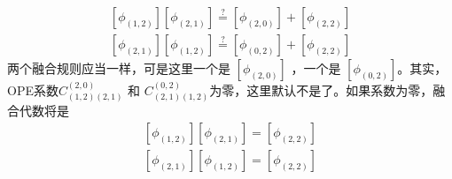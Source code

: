 \begin{equation}
\begin{array}{l} {\left[\phi_{(1,2)}\right]\left[\phi_{(2,1)}\right] \stackrel{?}{=}\left[\phi_{(2,0)}\right]+\left[\phi_{(2,2)}\right]} \\ {\left[\phi_{(2,1)}\right]\left[\phi_{(1,2)}\right] \stackrel{?}{=}\left[\phi_{(0,2)}\right]+\left[\phi_{(2,2)}\right]} \end{array}
\end{equation}
两个融合规则应当一样，可是这里一个是 $\left[\phi_{(2,0)}\right]$ ，一个是 $\left[\phi_{(0,2)}\right] $。其实，OPE系数$ C_{(1,2)(2,1)}^{(2,0)}$ 和 $C_{(2,1)(1,2)}^{(0,2)} $为零，这里默认不是了。如果系数为零，融合代数将是
\begin{equation}
	\begin{array}{l} {\left[\phi_{(1,2)}\right]\left[\phi_{(2,1)}\right]=\left[\phi_{(2,2)}\right]} \\ {\left[\phi_{(2,1)}\right]\left[\phi_{(1,2)}\right]=\left[\phi_{(2,2)}\right]} \end{array}
\end{equation}

